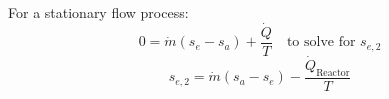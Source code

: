 For a stationary flow process:  
\[
0 = \dot{m}(s_e - s_a) + \frac{\dot{Q}}{T} \quad \text{to solve for } s_{e,2}
\]  
\[
s_{e,2} = \dot{m}(s_a - s_e) - \frac{\dot{Q}_{\text{Reactor}}}{T}
\]